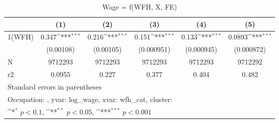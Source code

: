 \begin{table}[htbp]\centering
\def\sym#1{\ifmmode^{#1}\else\(^{#1}\)\fi}
\caption{Wage = f(WFH, X, FE)}
\begin{tabular}{l*{5}{c}}
\hline\hline
                    &\multicolumn{1}{c}{(1)}         &\multicolumn{1}{c}{(2)}         &\multicolumn{1}{c}{(3)}         &\multicolumn{1}{c}{(4)}         &\multicolumn{1}{c}{(5)}         \\
\hline
1(WFH)              &       0.347\sym{***}&       0.216\sym{***}&       0.151\sym{***}&       0.133\sym{***}&      0.0893\sym{***}\\
                    &   (0.00108)         &   (0.00105)         &  (0.000951)         &  (0.000945)         &  (0.000872)         \\
\hline
N                   &     9712293         &     9712293         &     9712293         &     9712293         &     9712292         \\
r2                  &      0.0955         &       0.227         &       0.377         &       0.404         &       0.482         \\
\hline\hline
\multicolumn{6}{l}{\footnotesize Standard errors in parentheses}\\
\multicolumn{6}{l}{\footnotesize Occupation: , yvar: log\_wage, xvar: wfh\_cat, cluster: }\\
\multicolumn{6}{l}{\footnotesize \sym{*} \(p<0.1\), \sym{**} \(p<0.05\), \sym{***} \(p<0.001\)}\\
\end{tabular}
\end{table}

